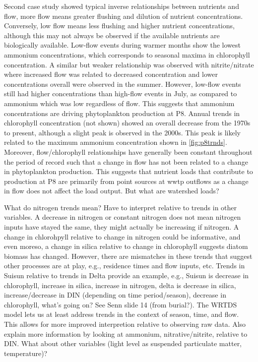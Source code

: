 \documentclass[journal = esthag, manuscript = article]{achemso}\usepackage[]{graphicx}\usepackage[]{color}
\begin{document}
Second case study showed typical inverse relationships between nutrients and flow, more flow means greater flushing and dilution of nutrient concentrations.  Conversely, low flow means less flushing and higher nutrient concentrations, although this may not always be observed if the available nutrients are biologically available.  Low-flow events during warmer months show the lowest ammonium concentrations, which corresponds to seasonal maxima in chlorophyll concentration.  A similar but weaker relationship was observed with nitrite/nitrate where increased flow was related to decreased concentration and lower concentrations overall were observed in the summer.  However, low-flow events still had higher concentrations than high-flow events in July, as compared to ammonium which was low regardless of flow.  This suggests that ammonium concentrations are driving phytoplankton production at P8.  Annual trends in chlorophyll concentration (not shown) showed an overall decrease from the 1970s to present, although a slight peak is observed in the 2000s.  This peak is likely related to the maximum ammonium concentration shown in \cref{fig:p8trnds}.  Moreover, flow/chlorophyll relationships have generally been constant throughout the period of record such that a change in flow has not been related to a change in phytoplankton production.  This suggests that nutrient loads that contribute to production at P8 are primarily from point sources at \ac{wwtp} outflows as a change in flow does not affect the load output.  But what are watershed loads?  

What do nitrogen trends mean?  Have to interpret relative to trends in other variables.  A decrease in nitrogen or constant nitrogen does not mean nitrogen inputs have stayed the same, they might actually be increasing if nitrogen.  A change in chlorohpyll relative to change in nitrogen could be informative, and even moreso, a change in silica relative to change in chlorophyll suggests diatom biomass has changed.  However, there are mismatches in these trends that suggest other processes are at play, e.g., residence times and flow inputs, etc.  Trends in Suisun relative to trends in Delta provide an example, e.g., Suisun is decrease in chlorophyll, increase in silica, increase in nitrogen, delta is decrease in silica, increase/decrease in DIN (depending on time period/season), decrease in chlorophyll, what's going on? See Senn slide 14 (from burial?). The WRTDS model lets us at least address trends in the context of season, time, and flow.  This allows for more improved interpretion relative to observing raw data. Also explain more information by looking at ammonium, nitrative/nitrite, relative to DIN. What about other variables (light level as suspended particulate matter, temperature)?
\end{document}
